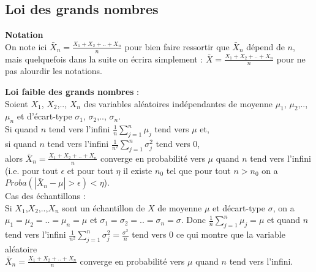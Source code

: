 \documentclass[a4paper,11pt]{book}
\begin{document}
\subsection{Loi des grands nombres}
{\bf Notation} \\
On note ici $\displaystyle \bar X_n=\frac{X_1+X_2+..+X_n}{n}$
pour bien faire ressortir que $\bar X_n$ d\'epend de $n$,
mais quelquefois dans la suite on \'ecrira simplement :
$\displaystyle \bar X=\frac{X_1+X_2+..+X_n}{n}$ pour ne pas alourdir les 
notations.

{\bf Loi faible des grands nombres} :\\
Soient $X_1$, $X_2$,.., $X_n$ des variables al\'eatoires ind\'ependantes de 
moyenne $\mu_1$, $\mu_2$,.., $\mu_n$ et d'\'ecart-type $\sigma_1$, 
$\sigma_2$,.., $\sigma_n$.\\
Si quand $n$ tend vers l'infini 
$\frac{1}{n} \sum _{j=1}^n \mu_j $ tend vers $\mu$ et,\\
 si quand $n$ tend vers 
l'infini  $\frac{1}{n^2} \sum _{j=1}^n \sigma_j^2$ tend vers $0$,\\
 alors  
$\displaystyle \bar X_n=\frac{X_1+X_2+..+X_n}{n}$ converge en probabilit\'e 
vers $\mu$ quand $n$ tend vers l'infini (i.e. pour tout $\epsilon$ et pour tout
$\eta$ il existe $n_0$ tel que pour tout $n>n_0$ on
a $Proba(|\bar X_n-\mu|>\epsilon)<\eta$).\\
Cas des \'echantillons :\\
Si $X_1$,$X_2$,..,$X_n$ sont un \'echantillon de $X$ de moyenne $\mu$ et 
d\'ecart-type $\sigma$, on a  $\mu_1=\mu_2=..=\mu_n=\mu$ et 
$\sigma_1= \sigma_2=..=\sigma_n=\sigma$. 
Donc $\frac{1}{n} \sum _{j=1}^n \mu_j =\mu$ et quand $n$ tend vers l'infini 
$\frac{1}{n^2} \sum _{j=1}^n \sigma_j^2 =\frac{\sigma^2}{n}$ tend vers $0$ 
ce qui montre que la variable al\'eatoire \\
$\displaystyle \bar X_n=\frac{X_1+X_2+..+X_n}{n}$ converge en probabilit\'e 
vers $\mu$ quand $n$ tend vers l'infini.\\
\end{document}
